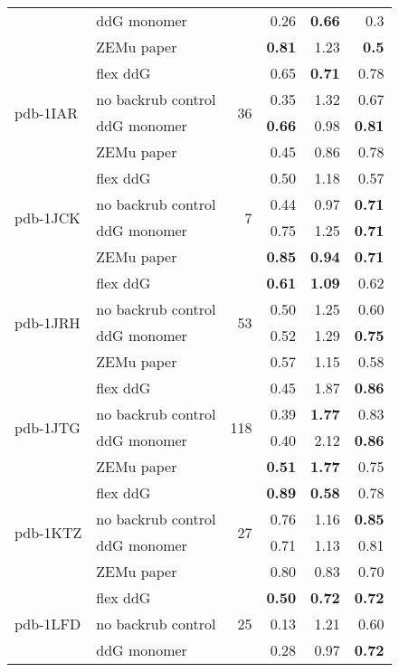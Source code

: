 {\begin{longtable}{llrrrr}
 & ddG monomer & & 0.26 & \textbf{0.66} & 0.3  \\
 & ZEMu paper & & \textbf{0.81} & 1.23 & \textbf{0.5}  \\
\hline
 \multirow{ 4}{*}{pdb-1IAR} & flex ddG & \multirow{ 4}{*}{36} & 0.65 & \textbf{0.71} & 0.78  \\
 & no backrub control & & 0.35 & 1.32 & 0.67  \\
 & ddG monomer & & \textbf{0.66} & 0.98 & \textbf{0.81}  \\
 & ZEMu paper & & 0.45 & 0.86 & 0.78  \\
\hline
 \multirow{ 4}{*}{pdb-1JCK} & flex ddG & \multirow{ 4}{*}{7} & 0.50 & 1.18 & 0.57  \\
 & no backrub control & & 0.44 & 0.97 & \textbf{0.71}  \\
 & ddG monomer & & 0.75 & 1.25 & \textbf{0.71}  \\
 & ZEMu paper & & \textbf{0.85} & \textbf{0.94} & \textbf{0.71}  \\
\hline
 \multirow{ 4}{*}{pdb-1JRH} & flex ddG & \multirow{ 4}{*}{53} & \textbf{0.61} & \textbf{1.09} & 0.62  \\
 & no backrub control & & 0.50 & 1.25 & 0.60  \\
 & ddG monomer & & 0.52 & 1.29 & \textbf{0.75}  \\
 & ZEMu paper & & 0.57 & 1.15 & 0.58  \\
\hline
 \multirow{ 4}{*}{pdb-1JTG} & flex ddG & \multirow{ 4}{*}{118} & 0.45 & 1.87 & \textbf{0.86}  \\
 & no backrub control & & 0.39 & \textbf{1.77} & 0.83  \\
 & ddG monomer & & 0.40 & 2.12 & \textbf{0.86}  \\
 & ZEMu paper & & \textbf{0.51} & \textbf{1.77} & 0.75  \\
\hline
 \multirow{ 4}{*}{pdb-1KTZ} & flex ddG & \multirow{ 4}{*}{27} & \textbf{0.89} & \textbf{0.58} & 0.78  \\
 & no backrub control & & 0.76 & 1.16 & \textbf{0.85}  \\
 & ddG monomer & & 0.71 & 1.13 & 0.81  \\
 & ZEMu paper & & 0.80 & 0.83 & 0.70  \\
\hline
 \multirow{ 4}{*}{pdb-1LFD} & flex ddG & \multirow{ 4}{*}{25} & \textbf{0.50} & \textbf{0.72} & \textbf{0.72}  \\
 & no backrub control & & 0.13 & 1.21 & 0.60  \\
 & ddG monomer & & 0.28 & 0.97 & \textbf{0.72}  \\

\end{longtable}}
